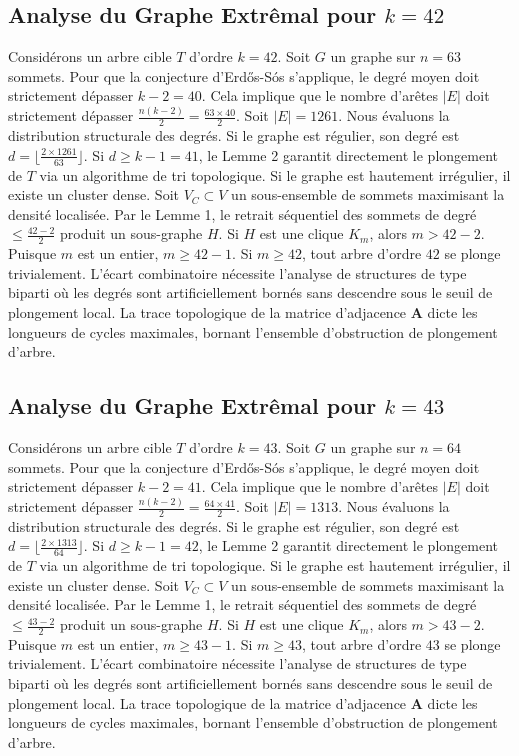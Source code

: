 \documentclass[11pt,a4paper]{article}
\begin{document}
\subsection{Analyse du Graphe Extr\^emal pour $k=42$}
Consid\'erons un arbre cible $T$ d'ordre $k=42$.
Soit $G$ un graphe sur $n=63$ sommets.
Pour que la conjecture d'Erd\H{o}s-S\'os s'applique, le degr\'e moyen doit strictement d\'epasser $k-2 = 40$.
Cela implique que le nombre d'ar\^etes $|E|$ doit strictement d\'epasser $\frac{n(k-2)}{2} = \frac{63 \times 40}{2}$.
Soit $|E| = 1261$.
Nous \'evaluons la distribution structurale des degr\'es. Si le graphe est r\'egulier, son degr\'e est $d = \lfloor \frac{2 \times 1261}{63} \rfloor$.
Si $d \geq k-1 = 41$, le Lemme 2 garantit directement le plongement de $T$ via un algorithme de tri topologique.
Si le graphe est hautement irr\'egulier, il existe un cluster dense. Soit $V_C \subset V$ un sous-ensemble de sommets maximisant la densit\'e localis\'ee.
Par le Lemme 1, le retrait s\'equentiel des sommets de degr\'e $\leq \frac{42-2}{2}$ produit un sous-graphe $H$.
Si $H$ est une clique $K_{m}$, alors $m > 42-2$. Puisque $m$ est un entier, $m \geq 42-1$. Si $m \geq 42$, tout arbre d'ordre $42$ se plonge trivialement.
L'\'ecart combinatoire n\'ecessite l'analyse de structures de type biparti o\`u les degr\'es sont artificiellement born\'es sans descendre sous le seuil de plongement local. La trace topologique de la matrice d'adjacence $\mathbf{A}$ dicte les longueurs de cycles maximales, bornant l'ensemble d'obstruction de plongement d'arbre.


\subsection{Analyse du Graphe Extr\^emal pour $k=43$}
Consid\'erons un arbre cible $T$ d'ordre $k=43$.
Soit $G$ un graphe sur $n=64$ sommets.
Pour que la conjecture d'Erd\H{o}s-S\'os s'applique, le degr\'e moyen doit strictement d\'epasser $k-2 = 41$.
Cela implique que le nombre d'ar\^etes $|E|$ doit strictement d\'epasser $\frac{n(k-2)}{2} = \frac{64 \times 41}{2}$.
Soit $|E| = 1313$.
Nous \'evaluons la distribution structurale des degr\'es. Si le graphe est r\'egulier, son degr\'e est $d = \lfloor \frac{2 \times 1313}{64} \rfloor$.
Si $d \geq k-1 = 42$, le Lemme 2 garantit directement le plongement de $T$ via un algorithme de tri topologique.
Si le graphe est hautement irr\'egulier, il existe un cluster dense. Soit $V_C \subset V$ un sous-ensemble de sommets maximisant la densit\'e localis\'ee.
Par le Lemme 1, le retrait s\'equentiel des sommets de degr\'e $\leq \frac{43-2}{2}$ produit un sous-graphe $H$.
Si $H$ est une clique $K_{m}$, alors $m > 43-2$. Puisque $m$ est un entier, $m \geq 43-1$. Si $m \geq 43$, tout arbre d'ordre $43$ se plonge trivialement.
L'\'ecart combinatoire n\'ecessite l'analyse de structures de type biparti o\`u les degr\'es sont artificiellement born\'es sans descendre sous le seuil de plongement local. La trace topologique de la matrice d'adjacence $\mathbf{A}$ dicte les longueurs de cycles maximales, bornant l'ensemble d'obstruction de plongement d'arbre.
\end{document}
